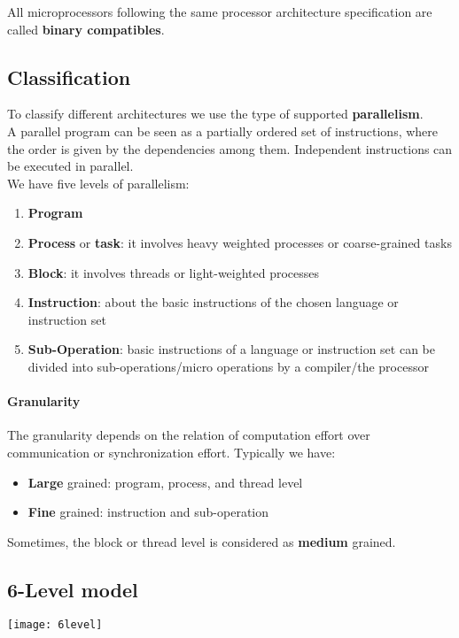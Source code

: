 \begin{definition}
	All microprocessors following the same processor architecture specification are called \textbf{binary compatibles}.
\end{definition}

\subsection{Classification}
To classify different architectures we use the type of supported \textbf{parallelism}.\\
A parallel program can be seen as a partially ordered set of instructions, where the order is given by the dependencies among them. Independent instructions can be executed in parallel.\\
We have five levels of parallelism:
\begin{enumerate}
	\item \textbf{Program}
	\item \textbf{Process} or \textbf{task}: it involves heavy weighted processes or coarse-grained tasks
	\item \textbf{Block}: it involves threads or light-weighted processes
	\item \textbf{Instruction}: about the basic instructions of the chosen language or instruction set
	\item \textbf{Sub-Operation}: basic instructions of a language or instruction set can be divided into sub-operations/micro operations by a compiler/the processor
\end{enumerate}

\paragraph{Granularity}
The granularity depends on the relation of computation effort over communication or synchronization effort. Typically we have:
\begin{itemize}
	\item \textbf{Large} grained: program, process, and thread level 
	\item \textbf{Fine} grained: instruction and sub-operation
\end{itemize}
\begin{note}
	Sometimes, the block or thread level is considered as \textbf{medium} grained.	
\end{note}

\subsection{6-Level model}
\begin{center}
	\texttt{[image: 6level]}
\end{center}